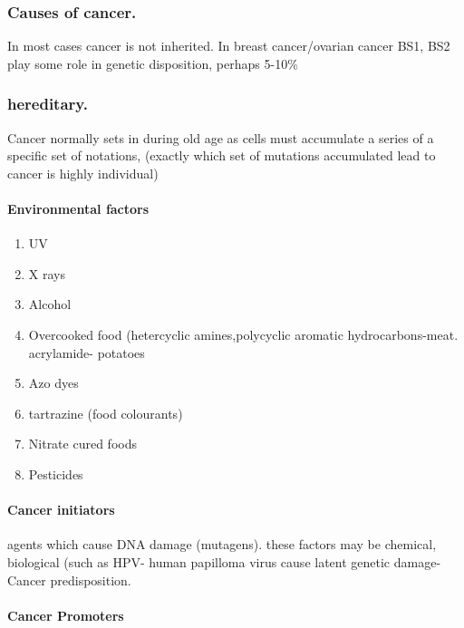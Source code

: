 \documentclass[]{article}
\providecommand{\tightlist}{%
  \setlength{\itemsep}{0pt}\setlength{\parskip}{0pt}}
\let\oldparagraph\paragraph
\renewcommand{\paragraph}[1]{\oldparagraph{#1}\mbox{}}
\begin{document}
\hypertarget{causes-of-cancer.}{%
\subsubsection{Causes of cancer.}\label{causes-of-cancer.}}

In most cases cancer is not inherited. In breast cancer/ovarian cancer
BS1, BS2 play some role in genetic disposition, perhaps 5-10\%

\hypertarget{hereditary.}{%
\subsubsection{hereditary.}\label{hereditary.}}

Cancer normally sets in during old age as cells must accumulate a series
of a specific set of notations, (exactly which set of mutations
accumulated lead to cancer is highly individual)

\hypertarget{environmental-factors}{%
\paragraph{Environmental factors}\label{environmental-factors}}

\begin{enumerate}
\def\labelenumi{\arabic{enumi}.}
\tightlist
\item
  UV
\item
  X rays
\item
  Alcohol
\item
  Overcooked food (hetercyclic amines,polycyclic aromatic
  hydrocarbons-meat. acrylamide- potatoes
\item
  Azo dyes
\item
  tartrazine (food colourants)
\item
  Nitrate cured foods
\item
  Pesticides
\end{enumerate}

\hypertarget{cancer-initiators}{%
\paragraph{Cancer initiators}\label{cancer-initiators}}

agents which cause DNA damage (mutagens). these factors may be chemical,
biological (such as HPV- human papilloma virus cause latent genetic
damage- Cancer predisposition.

\hypertarget{cancer-promoters}{%
\paragraph{Cancer Promoters}\label{cancer-promoters}}
\end{document}
